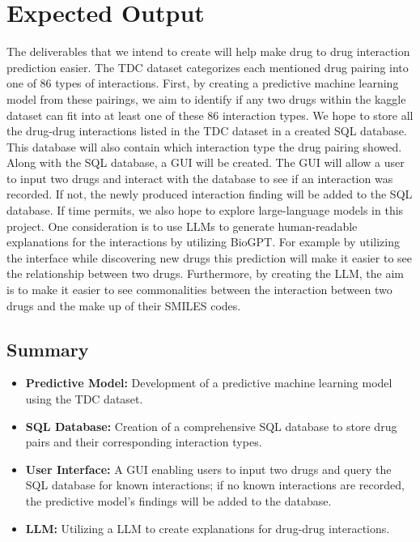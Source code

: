 \documentclass{report}
\begin{document}
\chapter{Expected Output}

The deliverables that we intend to create will help make drug to drug interaction prediction easier. The TDC dataset categorizes each mentioned drug pairing into one of 86 types of interactions. First, by creating a predictive machine learning model from these pairings, we aim to identify if any two drugs within the kaggle dataset can fit into at least one of these 86 interaction types.
We hope to store all the drug-drug interactions listed in the TDC dataset in a created SQL database. This database will also contain which interaction type the drug pairing showed. Along with the SQL database, a GUI will be created. The GUI will allow a user to input two drugs and interact with the database to see if an interaction was recorded. If not, the newly produced interaction finding will be added to the SQL database. 
If time permits, we also hope to explore large-language models in this project. One consideration is to use LLMs to generate human-readable explanations for the interactions by utilizing BioGPT. 
For example by utilizing the interface while discovering new drugs this prediction will make it easier to see the relationship between two drugs. Furthermore, by creating the LLM, the aim is to make it easier to see commonalities between the interaction between two drugs and the make up of their SMILES codes. 
\section{Summary}
\begin{itemize}
    \item \textbf{Predictive Model:} Development of a predictive machine learning model using the TDC dataset.
    \item \textbf{SQL Database:}  Creation of a comprehensive SQL database to store drug pairs and their corresponding interaction types.
    \item \textbf{User Interface:} A GUI enabling users to input two drugs and query the SQL database for known interactions; if no known interactions are recorded, the predictive model’s findings will be added to the database.
    \item \textbf{LLM:} Utilizing a LLM to create explanations for drug-drug interactions.
\end{itemize}
\end{document}
